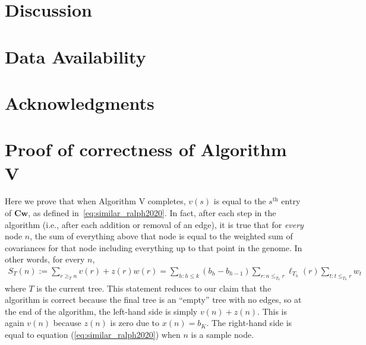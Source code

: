 

\section{Discussion}



\section*{Data Availability}



\section*{Acknowledgments}





\clearpage

\appendix




\setcounter{table}{0}
\setcounter{figure}{0}
\renewcommand{\thetable}{A\arabic{table}}
\renewcommand{\thefigure}{A\arabic{figure}}

\section{Proof of correctness of Algorithm V}\label{sec-proof-algv-correct}

Here we prove that when Algorithm V completes, $v(s)$ is equal to the
$s^{\text{th}}$ entry of $\mathbf{C}\mathbf{w}$, as defined
in~\eqref{eq:similar_ralph2020}.
In fact, after each step in the algorithm (i.e., after each addition or removal of an edge), 
it is true that for \textit{every} node $n$, the sum of everything above that node is equal to the weighted sum of covariances
for that node including everything up to that point in the genome.
In other words, for every $n$,
\begin{align} \label{eqn:matvec_consistent}
    S_T(n):=
    \sum_{r \ge_T n} v(r) + z(r)w(r) 
    = 
    \sum_{h:h \le k} (b_h-b_{h-1}) \sum_{r:n \le_{T_h} r} \ell_{T_h}(r) \sum_{t: t \le_{T_h} r} w_t
\end{align}
where $T$ is the current tree.
This statement reduces to our claim that the algorithm is correct because
the final tree is an ``empty'' tree with no edges,
so at the end of the algorithm, the left-hand side is simply $v(n)+z(n)$.
This is again $v(n)$ because $z(n)$ is zero due to $x(n)=b_K$.
The right-hand side is equal to equation 
(\ref{eq:similar_ralph2020}) when $n$ is a sample node.


